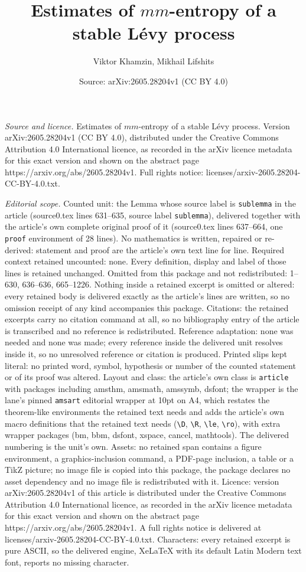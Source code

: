 \documentclass[10pt,a4paper]{amsart}
\title[Estimates of $mm$-entropy of a stable L\'evy process]{Estimates of $mm$-entropy of a stable L\'evy process}
\author{Viktor Khamzin, Mikhail Lifshits}
\date{Source: arXiv:2605.28204v1 (CC BY 4.0)}
\begin{document}
\maketitle

\noindent\emph{Source and licence.} Estimates of $mm$-entropy of a stable L\'evy process. Version arXiv:2605.28204v1 (CC BY 4.0), distributed under the Creative Commons Attribution 4.0 International licence, as recorded in the arXiv licence metadata for this exact version and shown on the abstract page https://arxiv.org/abs/2605.28204v1. Full rights notice: licenses/arxiv-2605.28204-CC-BY-4.0.txt.\par\smallskip

\noindent\textit{Editorial scope.} Counted unit: the Lemma whose source label is \texttt{sublemma} in the article (source0.tex lines 631--635, source label \texttt{sublemma}), delivered together with the article's own complete original proof of it (source0.tex lines 637--664, one \texttt{proof} environment of 28 lines). No mathematics is written, repaired or re-derived: statement and proof are the article's own text line for line. Required context retained uncounted: none. Every definition, display and label of those lines is retained unchanged. Omitted from this package and not redistributed: 1--630, 636--636, 665--1226. Nothing inside a retained excerpt is omitted or altered: every retained body is delivered exactly as the article's lines are written, so no omission receipt of any kind accompanies this package. Citations: the retained excerpts carry no citation command at all, so no bibliography entry of the article is transcribed and no reference is redistributed. Reference adaptation: none was needed and none was made; every reference inside the delivered unit resolves inside it, so no unresolved reference or citation is produced. Printed slips kept literal: no printed word, symbol, hypothesis or number of the counted statement or of its proof was altered. Layout and class: the article's own class is \texttt{article} with packages including amsthm, amsmath, amssymb, dsfont; the wrapper is the lane's pinned \texttt{amsart} editorial wrapper at 10pt on A4, which restates the theorem-like environments the retained text needs and adds the article's own macro definitions that the retained text needs (\texttt{\textbackslash D}, \texttt{\textbackslash R}, \texttt{\textbackslash le}, \texttt{\textbackslash ro}), with extra wrapper packages (bm, bbm, dsfont, xspace, cancel, mathtools). The delivered numbering is the unit's own. Assets: no retained span contains a figure environment, a graphics-inclusion command, a PDF-page inclusion, a table or a TikZ picture; no image file is copied into this package, the package declares no asset dependency and no image file is redistributed with it. Licence: version arXiv:2605.28204v1 of this article is distributed under the Creative Commons Attribution 4.0 International licence, as recorded in the arXiv licence metadata for this exact version and shown on the abstract page https://arxiv.org/abs/2605.28204v1. A full rights notice is delivered at licenses/arxiv-2605.28204-CC-BY-4.0.txt. Characters: every retained excerpt is pure ASCII, so the delivered engine, XeLaTeX with its default Latin Modern text font, reports no missing character.
\end{document}
